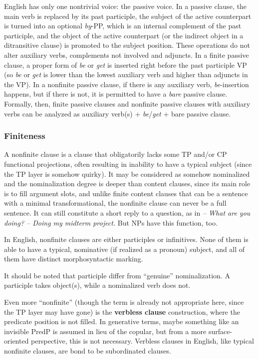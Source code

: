 \documentclass{article}
\newcommand*{\concept}[1]{\textbf{#1}}
\newcommand*{\corpus}[1]{\emph{#1}}
\begin{document}
English has only one nontrivial voice: the passive voice.
In a passive clause, the main verb is replaced by its past participle,
the subject of the active counterpart is turned into an optional \corpus{by}-PP,
which is an internal complement of the past participle,
and the object of the active counterpart (or the indirect object in a ditransitive clause) %
is promoted to the subject position.
These operations do not alter auxiliary verbs, complements not involved and adjuncts.
In a finite passive clause, 
a proper form of \corpus{be} or \corpus{get} is inserted 
right before the past participle VP 
(so \corpus{be} or \corpus{get} is lower than the lowest auxiliary verb and higher than adjuncts in the VP).
In a nonfinite passive clause,
if there is any auxiliary verb, 
\corpus{be}-insertion happens,
but if there is not,
it is permitted to have a \emph{bare} passive clause.
Formally, then, finite passive clauses and nonfinite passive clauses with auxiliary verbs 
can be analyzed as auxiliary verb(s) + \corpus{be}/\corpus{get} + bare passive clause. 

\subsubsection{Finiteness}\label{sec:finiteness}

A nonfinite clause is a clause that obligatorily lacks some TP and/or CP functional projections,
often resulting in inability to have a typical subject (since the TP layer is somehow quirky).
It may be considered as somehow nominalized and the nominalization degree is deeper than content clauses, %
since its main role is to fill argument slots,
and unlike finite content clauses that can be a sentence with a minimal transformational,
the nonfinite clause can never be a full sentence.
It can still constitute a short reply to a question, as in 
\corpus{-- What are you doing? -- Doing my midterm project.}
But NPs have this function, too.

In English, nonfinite clauses are either participles or infinitives.
None of them is able to have a typical, nominative (if realized as a pronoun) subject,
and all of them have distinct morphosyntactic marking.

It should be noted that participle differ from ``genuine'' nominalization. %
A participle takes object(s), 
while a nominalized verb does not. 

Even more ``nonfinite'' (though the term is already not appropriate here, since the TP layer may have gone)
is the \concept{verbless clause} construction, 
where the predicate position is not filled.
In generative terms, maybe something like an invisible PredP is assumed in lieu of the copular, 
but from a more surface-oriented perspective, this is not necessary.
Verbless clauses in English, like typical nonfinite clauses, 
are bond to be subordinated clauses.
\end{document}
